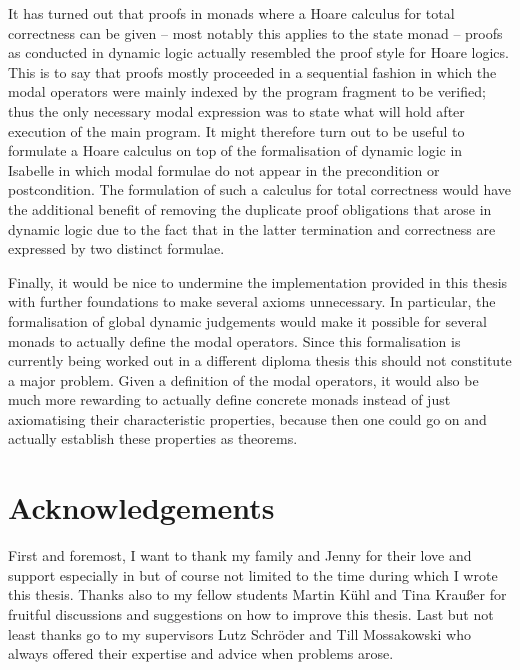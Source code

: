 It has turned out that proofs in monads where a Hoare calculus for total
correctness can be given -- most notably this applies to the state monad --
proofs as conducted in dynamic logic actually resembled the proof style for
Hoare logics. This is to say that proofs mostly proceeded in a sequential
fashion in which the modal operators were mainly indexed by the program fragment
to be verified; thus the only necessary modal expression was to state what will
hold after execution of the main program. It might therefore turn out to be
useful to formulate a Hoare calculus on top of the formalisation of dynamic
logic in Isabelle in which modal formulae do not appear in the precondition or
postcondition. The formulation of such a calculus for total correctness would
have the additional benefit of removing the duplicate proof obligations that
arose in dynamic logic due to the fact that in the latter termination and
correctness are expressed by two distinct formulae.

Finally, it would be nice to undermine the implementation provided in this
thesis with further foundations to make several axioms unnecessary. In
particular, the formalisation of global dynamic judgements would make it
possible for several monads to actually define the modal operators. Since this
formalisation is currently being worked out in a different diploma thesis this
should not constitute a major problem. Given a definition of the modal
operators, it would also be much more rewarding to actually define concrete
monads instead of just axiomatising their characteristic properties, because
then one could go on and actually establish these properties as theorems.

\section*{Acknowledgements}
First and foremost, I want to thank my family and Jenny for their love and
support especially in but of course not limited to the time during which I wrote
this thesis. Thanks also to my fellow students Martin K\"uhl and Tina Krau\ss er
for fruitful discussions and suggestions on how to improve this thesis.  Last
but not least thanks go to my supervisors Lutz Schr\"oder and Till Mossakowski
who always offered their expertise and advice when problems arose.



